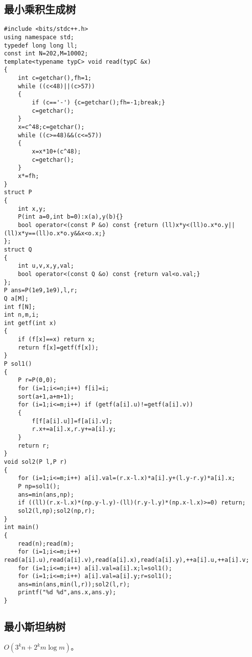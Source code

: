 \documentclass[12pt]{ctexart}
\begin{document}
\subsection{最小乘积生成树}

\begin{lstlisting}
#include <bits/stdc++.h>
using namespace std;
typedef long long ll;
const int N=202,M=10002;
template<typename typC> void read(typC &x)
{
	int c=getchar(),fh=1;
	while ((c<48)||(c>57))
	{
		if (c=='-') {c=getchar();fh=-1;break;}
		c=getchar();
	}
	x=c^48;c=getchar();
	while ((c>=48)&&(c<=57))
	{
		x=x*10+(c^48);
		c=getchar();
	}
	x*=fh;
}
struct P
{
	int x,y;
	P(int a=0,int b=0):x(a),y(b){}
	bool operator<(const P &o) const {return (ll)x*y<(ll)o.x*o.y||(ll)x*y==(ll)o.x*o.y&&x<o.x;}
};
struct Q
{
	int u,v,x,y,val;
	bool operator<(const Q &o) const {return val<o.val;}
};
P ans=P(1e9,1e9),l,r;
Q a[M];
int f[N];
int n,m,i;
int getf(int x)
{
	if (f[x]==x) return x;
	return f[x]=getf(f[x]);
}
P sol1()
{
	P r=P(0,0);
	for (i=1;i<=n;i++) f[i]=i;
	sort(a+1,a+m+1);
	for (i=1;i<=m;i++) if (getf(a[i].u)!=getf(a[i].v))
	{
		f[f[a[i].u]]=f[a[i].v];
		r.x+=a[i].x,r.y+=a[i].y;
	}
	return r;
}
void sol2(P l,P r)
{
	for (i=1;i<=m;i++) a[i].val=(r.x-l.x)*a[i].y+(l.y-r.y)*a[i].x;
	P np=sol1();
	ans=min(ans,np);
	if ((ll)(r.x-l.x)*(np.y-l.y)-(ll)(r.y-l.y)*(np.x-l.x)>=0) return;
	sol2(l,np);sol2(np,r);
}
int main()
{
	read(n);read(m);
	for (i=1;i<=m;i++) read(a[i].u),read(a[i].v),read(a[i].x),read(a[i].y),++a[i].u,++a[i].v;
	for (i=1;i<=m;i++) a[i].val=a[i].x;l=sol1();
	for (i=1;i<=m;i++) a[i].val=a[i].y;r=sol1();
	ans=min(ans,min(l,r));sol2(l,r);
	printf("%d %d",ans.x,ans.y);
}
\end{lstlisting}

\subsection{最小斯坦纳树}

$O(3^kn+2^km\log m)$。
\end{document}
